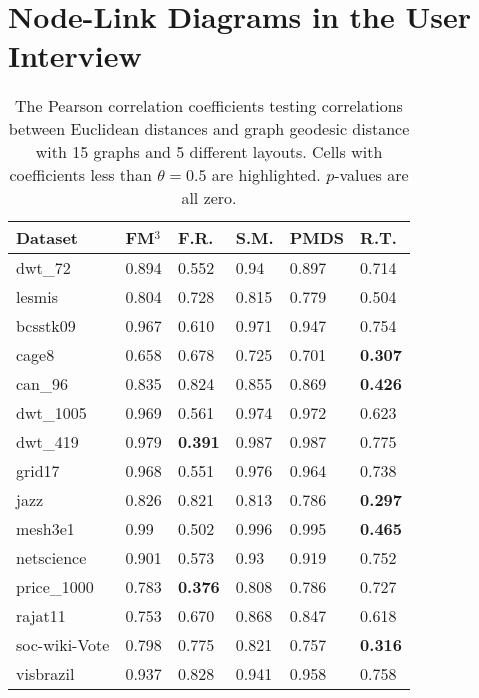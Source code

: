 \maketitle
\section{Node-Link Diagrams in the User Interview}

\begin{table}
\centering
\caption{\label{tab:pearson-correlation}The Pearson correlation coefficients testing correlations between Euclidean distances and graph geodesic distance with 15 graphs and 5 different layouts. Cells with coefficients less than $\theta=0.5$ are highlighted. $p$-values are all zero.}
\label{tab:pearson-correlation}
\begin{tabular}{llllll} 
\hline
Dataset       & FM$^3$ & F.R.           & S.M.  & PMDS  & R.T.            \\ 
\hline
dwt\_72       & 0.894  & 0.552          & 0.94  & 0.897 & 0.714           \\
lesmis        & 0.804  & 0.728          & 0.815 & 0.779 & 0.504           \\
bcsstk09      & 0.967  & 0.610          & 0.971 & 0.947 & 0.754           \\
cage8         & 0.658  & 0.678          & 0.725 & 0.701 & \textbf{0.307}  \\
can\_96       & 0.835  & 0.824          & 0.855 & 0.869 & \textbf{0.426}  \\
dwt\_1005     & 0.969  & 0.561          & 0.974 & 0.972 & 0.623           \\
dwt\_419      & 0.979  & \textbf{0.391} & 0.987 & 0.987 & 0.775           \\
grid17        & 0.968  & 0.551          & 0.976 & 0.964 & 0.738           \\
jazz          & 0.826  & 0.821          & 0.813 & 0.786 & \textbf{0.297}  \\
mesh3e1       & 0.99   & 0.502          & 0.996 & 0.995 & \textbf{0.465}  \\
netscience    & 0.901  & 0.573          & 0.93  & 0.919 & 0.752           \\
price\_1000   & 0.783  & \textbf{0.376} & 0.808 & 0.786 & 0.727           \\
rajat11       & 0.753  & 0.670          & 0.868 & 0.847 & 0.618           \\
soc-wiki-Vote & 0.798  & 0.775          & 0.821 & 0.757 & \textbf{0.316}  \\
visbrazil     & 0.937  & 0.828          & 0.941 & 0.958 & 0.758           \\
\hline
\end{tabular}
\end{table}